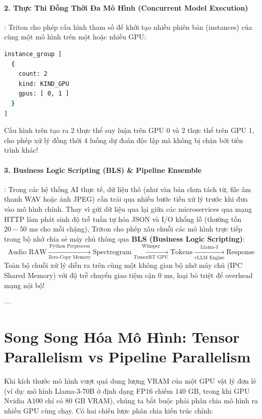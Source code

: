 \paragraph{2. Thực Thi Đồng Thời Đa Mô Hình (Concurrent Model Execution)}:
Triton cho phép cấu hình tham số  để khởi tạo nhiều phiên bản (instances) của cùng một mô hình trên một hoặc nhiều GPU:
\begin{lstlisting}[language=bash]
instance_group [
  {
    count: 2
    kind: KIND_GPU
    gpus: [ 0, 1 ]
  }
]
\end{lstlisting}
Cấu hình trên tạo ra 2 thực thể suy luận trên GPU 0 và 2 thực thể trên GPU 1, cho phép xử lý đồng thời 4 luồng dự đoán độc lập mà không bị chặn bởi tiến trình khác!

\paragraph{3. Business Logic Scripting (BLS) \& Pipeline Ensemble}:
Trong các hệ thống AI thực tế, dữ liệu thô (như văn bản chưa tách từ, file âm thanh WAV hoặc ảnh JPEG) cần trải qua nhiều bước tiền xử lý trước khi đưa vào mô hình chính. Thay vì gửi dữ liệu qua lại giữa các microservices qua mạng HTTP làm phát sinh độ trễ tuần tự hóa JSON và I/O khổng lồ (thường tốn $20-50\text{ ms}$ cho mỗi chặng), Triton cho phép xâu chuỗi các mô hình trực tiếp trong bộ nhớ chia sẻ máy chủ thông qua \textbf{BLS (Business Logic Scripting)}:
\begin{equation}
\text{Audio RAW} \xrightarrow[\text{Zero-Copy Memory}]{\text{Python Preprocess}} \text{Spectrogram} \xrightarrow[\text{TensorRT GPU}]{\text{Whisper}} \text{Tokens} \xrightarrow[\text{vLLM Engine}]{\text{Llama-3}} \text{Response}
\end{equation}
Toàn bộ chuỗi xử lý diễn ra trên cùng một không gian bộ nhớ máy chủ (IPC Shared Memory) với độ trễ chuyển giao tiệm cận $0\text{ ms}$, loại bỏ triệt để overhead mạng nội bộ!

---

\section{Song Song Hóa Mô Hình: Tensor Parallelism vs Pipeline Parallelism}
\label{sec:model-parallelism}

Khi kích thước mô hình vượt quá dung lượng VRAM của một GPU vật lý đơn lẻ (ví dụ: mô hình Llama-3-70B ở định dạng FP16 chiếm $140\text{ GB}$, trong khi GPU Nvidia A100 chỉ có $80\text{ GB}$ VRAM), chúng ta bắt buộc phải phân chia mô hình ra nhiều GPU cùng chạy. Có hai chiến lược phân chia kiến trúc chính:

